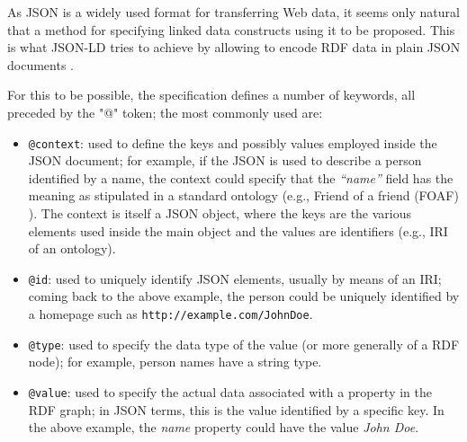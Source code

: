 
As JSON is a widely used format for transferring Web data, it seems only
natural that a method for specifying linked data constructs using it to be
proposed. This is what JSON-LD tries to achieve by allowing
to encode RDF data in plain JSON documents \cite{ref:jsonld}.

For this to be possible, the specification defines a number of keywords, all
preceded by the "@" token; the most commonly used are:
\begin{itemize}
  \item \texttt{@context}: used to define the keys and possibly values employed
                           inside the JSON document; for example, if the JSON
                           is used to describe a person identified by a name,
                           the context could specify that the \textit{``name''}
                           field has the meaning as stipulated in a standard
                           ontology (e.g., Friend of a friend
                           (FOAF) \cite{ref:foaf}). The context is itself a JSON
                           object, where the keys are the various elements used
                           inside the main object and the values are identifiers
                           (e.g., IRI of an ontology).
  \item \texttt{@id}: used to uniquely identify JSON elements, usually by
                      means of an IRI; coming back to the above example, the
                      person could be uniquely identified by a homepage such as
                      \texttt{http://example.com/JohnDoe}.
  \item \texttt{@type}: used to specify the data type of the value (or more
                        generally of a RDF node); for example, person names have
                        a string type.
  \item \texttt{@value}: used to specify the actual data associated with a
                         property in the RDF graph; in JSON terms, this is the
                         value identified by a specific key. In the above
                         example, the \textit{name} property could have the
                         value \textit{John Doe}.
\end{itemize}

